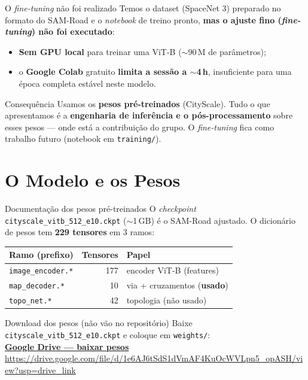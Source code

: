 \documentclass{beamer}
\newcommand{\pesoslink}{https://drive.google.com/file/d/1e6AJ6tSdS1dVmAF4KuOcWVLpn5_opASH/view?usp=drive_link}
\begin{document}
\begin{frame}{O \textit{fine-tuning} não foi realizado}
    \footnotesize
    Temos o dataset (SpaceNet 3) preparado no formato do SAM-Road e o \textit{notebook} de treino pronto, \textbf{mas o ajuste fino (\textit{fine-tuning}) não foi executado}:
    \begin{itemize}\setlength{\itemsep}{3pt}
        \item \textbf{Sem GPU local} para treinar uma ViT-B ($\sim$90\,M de parâmetros);
        \item o \textbf{Google Colab} gratuito \textbf{limita a sessão a $\sim$4\,h}, insuficiente para uma época completa estável neste modelo.
    \end{itemize}
    \vspace{0.1cm}
    \begin{block}{Consequência}
        \scriptsize Usamos os \textbf{pesos pré-treinados} (CityScale). Tudo o que apresentamos é a \textbf{engenharia de inferência e o pós-processamento} sobre esses pesos --- onde está a contribuição do grupo. O \textit{fine-tuning} fica como trabalho futuro (notebook em \texttt{training/}).
    \end{block}
\end{frame}

\section{O Modelo e os Pesos}

\begin{frame}[fragile]{Documentação dos pesos pré-treinados}
    \footnotesize
    O \textit{checkpoint} \texttt{cityscale\_vitb\_512\_e10.ckpt} ($\sim$1\,GB) é o SAM-Road ajustado. O dicionário de pesos tem \textbf{229 tensores} em 3 ramos:
    \vspace{0.1cm}
    \begin{tabular}{lrl}
        \toprule
        \textbf{Ramo (prefixo)} & \textbf{Tensores} & \textbf{Papel} \\
        \midrule
        \texttt{image\_encoder.*} & 177 & encoder ViT-B (features) \\
        \texttt{map\_decoder.*} & 10 & via + cruzamentos (\textbf{usado}) \\
        \texttt{topo\_net.*} & 42 & topologia (não usado) \\
        \bottomrule
    \end{tabular}
    \vspace{0.1cm}
    \begin{block}{Download dos pesos (não vão no repositório)}
        \scriptsize Baixe \texttt{cityscale\_vitb\_512\_e10.ckpt} e coloque em \texttt{weights/}:\\
        \href{\pesoslink}{\textbf{Google Drive --- baixar pesos}} \\[2pt]
        {\tiny\url{\pesoslink}}
    \end{block}
\end{frame}
\end{document}
